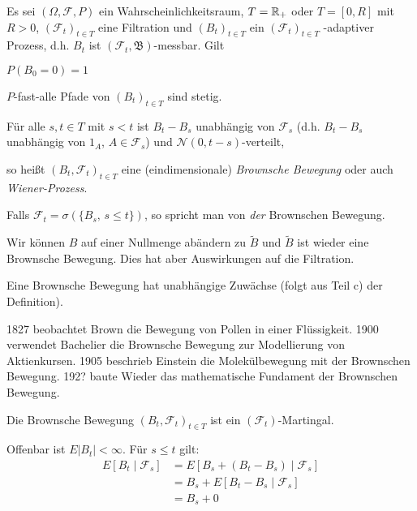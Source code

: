 \documentclass[a4paper,twoside,DIV15,BCOR12mm]{scrbook}
\newcommand{\cF}{\mathcal F}
\newcommand{\borel}{{\mathfrak B}}
\begin{document}
\begin{definition}
Es sei $(\Omega,\cF,P)$ ein Wahrscheinlichkeitsraum, $T=\mathbb{R}_+$ oder $T=[0,R]$ mit $R>0$, $(\cF_t)_{t\in T}$ eine Filtration und $(B_t)_{t\in T}$ ein $(\cF_t)_{t\in T}$
-adaptiver Prozess, d.h. $B_t$ ist $(\cF_t,\borel)$-messbar. Gilt 
\begin{enuma}
\item $P(B_0=0)=1$
\item $P$-fast-alle Pfade von $(B_t)_{t\in T}$ sind stetig.
\item Für alle $s,t\in T$ mit $s<t$ ist $B_t-B_s$ unabhängig von $\cF_s$ (d.h. $B_t-B_s$ unabhängig von $1_A$, $A\in \cF_s$) und $\mathcal N(0,t-s)$-verteilt,
\end{enuma}
so heißt $(B_t,\cF_t)_{t\in T}$ eine (eindimensionale) \emph{Brownsche Bewegung} oder auch \emph{Wiener-Prozess}.
\end{definition}

\begin{bemerkung}
\begin{enuma}
\item Falls $\cF_t = \sigma(\{B_s,\, s\le t\})$, so spricht man von \emph{der} Brownschen Bewegung.
\item Wir können $B$ auf einer Nullmenge abändern zu $\tilde B$ und $\tilde B$ ist wieder eine Brownsche Bewegung. Dies hat aber Auswirkungen auf die Filtration.
\item Eine Brownsche Bewegung hat unabhängige Zuwächse (folgt aus Teil c) der Definition).
\item 1827 beobachtet Brown die Bewegung von Pollen in einer Flüssigkeit. 1900 verwendet Bachelier die Brownsche Bewegung zur Modellierung von Aktienkursen. 1905 beschrieb Einstein die Molekülbewegung mit der Brownschen Bewegung. 192? baute Wieder das mathematische Fundament der Brownschen Bewegung.
\end{enuma}
\end{bemerkung}

\begin{lemma}
Die Brownsche Bewegung $(B_t,\cF_t)_{t\in T}$ ist ein $(\cF_t)$-Martingal.
\end{lemma}

\begin{beweis}
Offenbar ist $E|B_t|<\infty$. Für $s\le t$ gilt:
\begin{align*}
E[B_t\mid \cF_s] &= E[B_s + (B_t - B_s) \mid \cF_s] \\
&= B_s + E[B_t-B_s \mid \cF_s] \\
&= B_s + 0
\end{align*}
\end{beweis}
\end{document}
